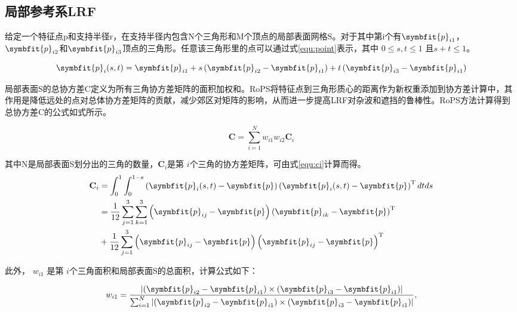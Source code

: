 \subsection{局部参考系LRF}

给定一个特征点p和支持半径r，在支持半径内包含N个三角形和M个顶点的局部表面网格S。对于其中第i个有$\symbfit{p}_{i1}$，$\symbfit{p}_{i2}$和$\symbfit{p}_{i3}$顶点的三角形。任意该三角形里的点可以通过式\ref{equ:point}表示，其中 $0 \leq s, t \leq 1$ 且$s+t \leq 1$。


\begin{equation}\label{equ:point}
    \symbfit{p}_{i}(s, t)=\symbfit{p}_{i 1}+s\left(\symbfit{p}_{i 2}-\symbfit{p}_{i 1}\right)+t\left(\symbfit{p}_{i 3}-\symbfit{p}_{i 1}\right)
\end{equation}

局部表面S的总协方差C定义为所有三角协方差矩阵的面积加权和。RoPS将特征点到三角形质心的距离作为新权重添加到协方差计算中，其作用是降低远处的点对总体协方差矩阵的贡献，减少郊区对矩阵的影响，从而进一步提高LRF对杂波和遮挡的鲁棒性。RoPS方法计算得到总协方差C的公式如式所示。

\begin{equation}
    \mathbf{C}=\sum_{i=1}^{N} w_{i 1} w_{i 2} \mathbf{C}_{i}
\end{equation}

其中N是局部表面S划分出的三角的数量，$\mathbf{C}_{i}$是第 $i$个三角的协方差矩阵，可由式\ref{equ:ci}计算而得。
\begin{equation}\label{equ:ci}
\begin{aligned}\mathbf{C}_{i} & =\int_{0}^{1} \int_{0}^{1-s}\left(\symbfit{p}_{i}(s, t)-\symbfit{p}\right)\left(\symbfit{p}_{i}(s, t)-\symbfit{p}\right)^{\mathrm{T}} d t d s \\& =\frac{1}{12} \sum_{j=1}^{3} \sum_{k=1}^{3}\left(\symbfit{p}_{i j}-\symbfit{p}\right)\left(\symbfit{p}_{i k}-\symbfit{p}\right)^{\mathrm{T}} \\& +\frac{1}{12} \sum_{j=1}^{3}\left(\symbfit{p}_{i j}-\symbfit{p}\right)\left(\symbfit{p}_{i j}-\symbfit{p}\right)^{\mathrm{T}}\end{aligned}
\end{equation}

此外， $w_{i1}$ 是第 $i$个三角面积和局部表面S的总面积，计算公式如下：

\begin{equation}
w_{i 1}=\frac{\left|\left(\symbfit{p}_{i 2}-\symbfit{p}_{i 1}\right) \times\left(\symbfit{p}_{i 3}-\symbfit{p}_{i 1}\right)\right|}{\sum_{i=1}^{N}\left|\left(\symbfit{p}_{i 2}-\symbfit{p}_{i 1}\right) \times\left(\symbfit{p}_{i 3}-\symbfit{p}_{i 1}\right)\right|},
\end{equation}

